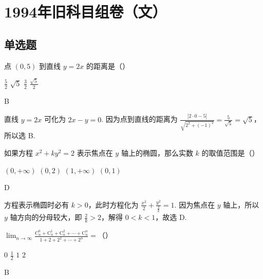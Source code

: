 \chapter{1994年旧科目组卷（文）}

\section{单选题}

\begin{problem}
点 \((0,5)\) 到直线 \(y=2x\) 的距离是（\quad）

\choices
    {\(\frac{5}{2}\)}
    {\(\sqrt{5}\)}
    {\(\frac{3}{2}\)}
    {\(\frac{\sqrt{5}}{2}\)}
\end{problem}

\begin{answer}
B
\end{answer}

\begin{solution}
直线 \(y=2x\) 可化为 \(2x-y=0\). 因为点到直线的距离为 \(\frac{|2\cdot 0-5|}{\sqrt{2^{2}+(-1)^{2}}}=\frac{5}{\sqrt{5}}=\sqrt{5}\)，所以选 B.
\end{solution}

\begin{problem}
如果方程 \(x^{2}+ky^{2}=2\) 表示焦点在 \(y\) 轴上的椭圆，那么实数 \(k\) 的取值范围是（\quad）

\choices
    {\((0,+\infty)\)}
    {\((0,2)\)}
    {\((1,+\infty)\)}
    {\((0,1)\)}
\end{problem}

\begin{answer}
D
\end{answer}

\begin{solution}
方程表示椭圆时必有 \(k>0\)，此时方程化为 \(\frac{x^{2}}{2}+\frac{y^{2}}{\frac{2}{k}}=1\). 因为焦点在 \(y\) 轴上，所以 \(y\) 轴方向的分母较大，即 \(\frac{2}{k}>2\)，解得 \(0<k<1\)，故选 D.
\end{solution}

\begin{problem}
\(\displaystyle\lim_{n\to\infty}\frac{\mathrm C_n^0+\mathrm C_n^1+\mathrm C_n^2+\cdots+\mathrm C_n^n}{1+2+2^{2}+\cdots+2^{n}}=\)（\quad）

\choices
    {\(0\)}
    {\(\frac{1}{2}\)}
    {\(1\)}
    {\(2\)}
\end{problem}

\begin{answer}
B
\end{answer}

